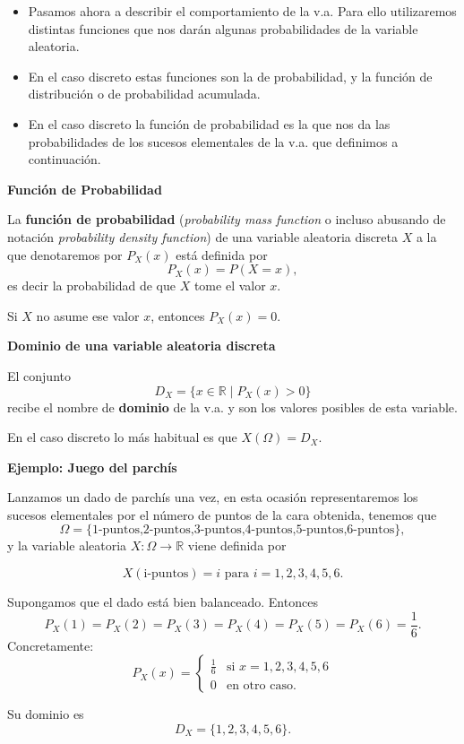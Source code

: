 \documentclass[]{book}
\providecommand{\tightlist}{%
  \setlength{\itemsep}{0pt}\setlength{\parskip}{0pt}}
\begin{document}
\begin{itemize}
\tightlist
\item
  Pasamos ahora a describir el comportamiento de la v.a.
  Para ello utilizaremos distintas funciones que nos darán algunas probabilidades de la variable aleatoria.
\item
  En el caso discreto estas funciones son la de probabilidad, y la función de distribución o de probabilidad acumulada.
\item
  En el caso discreto la función de probabilidad es la que nos da las probabilidades de los sucesos elementales de la v.a. que definimos a continuación.
\end{itemize}

 \textbf{Función de Probabilidad}

La \textbf{función de probabilidad} (\emph{probability mass function} o incluso abusando de notación \emph{probability density function}) de una variable aleatoria discreta \(X\) a la que denotaremos por \(P_{X}(x)\) está definida por
\[P_{X}(x)=P(X=x),\]
es decir la probabilidad de que \(X\) tome el valor \(x\).

Si \(X\) no asume ese valor \(x\), entonces \(P_{X}(x)=0\).

 \textbf{Dominio de una variable aleatoria discreta}

El conjunto \[D_X=\{ x\in\mathbb{R} \mid P_X(x)>0\}\] recibe el nombre de
\textbf{dominio} de la v.a. y son los valores posibles de esta variable.

En el caso discreto lo más habitual es que \(X(\Omega)=D_X\).

\textbf{Ejemplo: Juego del parchís}

Lanzamos un dado de parchís una vez, en esta ocasión representaremos los
sucesos elementales por el número de puntos de la cara obtenida, tenemos que
\[\Omega=\{\mbox{1-puntos,2-puntos,3-puntos,4-puntos,5-puntos,6-puntos}\},\]
y la variable aleatoria \(X:\Omega\to \mathbb{R}\) viene definida por

\[X(\mbox{i-puntos})=i\mbox{ para } i=1,2,3,4,5,6.\]

Supongamos que el dado está bien balanceado. Entonces
\[P_{X}(1)=P_{X}(2)=P_{X}(3)=P_{X}(4)=P_{X}(5)=P_{X}(6)=\frac16.\]
Concretamente:
\[
P_{X}(x)=
  \left\{
  \begin{array}{ll}
   \frac16 & \mbox{si } x=1,2,3,4,5,6\\
  0 & \mbox{en otro caso. }
  \end{array}
  \right.
\]

Su dominio es \[D_X=\{1,2,3,4,5,6\}.\]
\end{document}
